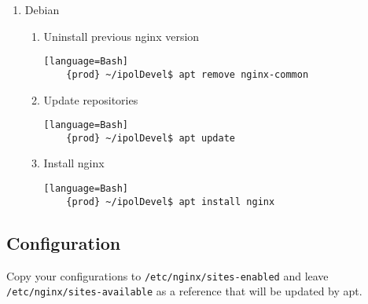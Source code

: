 \documentclass[a4paper,12pt]{article}
\begin{document}
\begin{enumerate}
\item Debian

\begin{enumerate}
    \item Uninstall previous nginx version
    \begin{verbatim}[language=Bash]
	{prod} ~/ipolDevel$ apt remove nginx-common
    \end{verbatim}

    \item Update repositories
    \begin{verbatim}[language=Bash]
    {prod} ~/ipolDevel$ apt update
    \end{verbatim}

    \item Install nginx
    \begin{verbatim}[language=Bash]
    {prod} ~/ipolDevel$ apt install nginx
    \end{verbatim}
    \end{enumerate}    
\end{enumerate}

\subsection{Configuration}

Copy your configurations to {\tt /etc/nginx/sites-enabled} and leave {\tt /etc/nginx/sites-available} as a reference that will be updated by apt.
\end{document}
